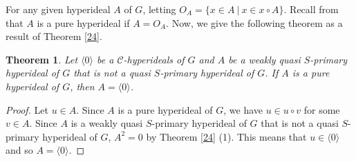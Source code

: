 \documentclass[preprint,review,10pt]{amsart}
\newtheorem{theorem}{Theorem}[section]
\theoremstyle{definition}
\theoremstyle{remark}
\numberwithin{equation}{section}
\begin{document}
For any given hyperideal $A$ of $G$, letting $O_A=\{x \in A \ \vert \ x \in x \circ A\}$. Recall from \cite{ameri5} that $A$ is a pure hyperideal if $A=O_A$. Now, we give the following theorem as a result of Theorem \ref{24}. 
\begin{theorem}
Let $\langle 0 \rangle$ be  a   $\mathcal{C}$-hyperideals of $G$   and $A$ be a  weakly quasi $S$-primary hyperideal  of $G$   that   is not a quasi $S$-primary hyperideal of $G$. If $A$ is a pure hyperideal of $G$, then $A=\langle 0 \rangle$.
\end{theorem}
\begin{proof}
Let $u \in A$. Since $A$ is a pure hyperideal of $G$, we have $u \in u \circ v $ for some $v \in A$. Since $A$ is a  weakly quasi $S$-primary hyperideal  of $G$   that   is not a quasi $S$-primary hyperideal of $G$, $A^2=0$ by Theorem \ref{24} (1). This means that $u \in \langle 0 \rangle$ and so $A=\langle 0 \rangle$.
\end{proof}
\end{document}
